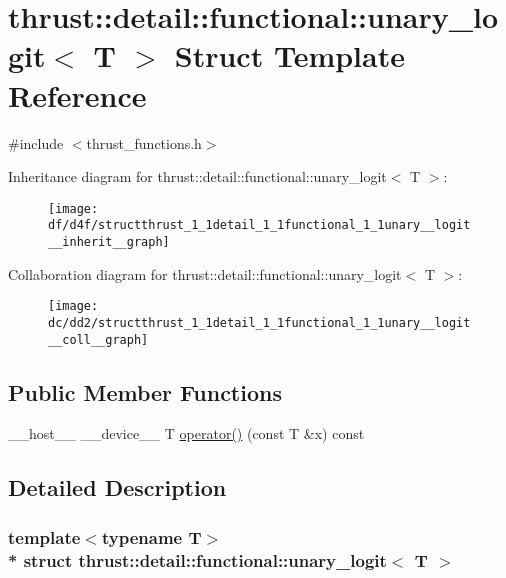 \hypertarget{structthrust_1_1detail_1_1functional_1_1unary__logit}{}\section{thrust\+:\+:detail\+:\+:functional\+:\+:unary\+\_\+logit$<$ T $>$ Struct Template Reference}
\label{structthrust_1_1detail_1_1functional_1_1unary__logit}


{\ttfamily \#include $<$thrust\+\_\+functions.\+h$>$}



Inheritance diagram for thrust\+:\+:detail\+:\+:functional\+:\+:unary\+\_\+logit$<$ T $>$\+:
\nopagebreak
\begin{figure}[H]
\begin{center}
\leavevmode
\texttt{[image: df/d4f/structthrust\_1\_1detail\_1\_1functional\_1\_1unary\_\_logit\_\_inherit\_\_graph]}
\end{center}
\end{figure}


Collaboration diagram for thrust\+:\+:detail\+:\+:functional\+:\+:unary\+\_\+logit$<$ T $>$\+:
\nopagebreak
\begin{figure}[H]
\begin{center}
\leavevmode
\texttt{[image: dc/dd2/structthrust\_1\_1detail\_1\_1functional\_1\_1unary\_\_logit\_\_coll\_\_graph]}
\end{center}
\end{figure}
\subsection*{Public Member Functions}
\begin{DoxyCompactItemize}
\item 
\+\_\+\+\_\+host\+\_\+\+\_\+ \+\_\+\+\_\+device\+\_\+\+\_\+ T \hyperlink{structthrust_1_1detail_1_1functional_1_1unary__logit_a8de2bf134020649c943862533931057c}{operator()} (const T \&x) const 
\end{DoxyCompactItemize}


\subsection{Detailed Description}
\subsubsection*{template$<$typename T$>$\\*
struct thrust\+::detail\+::functional\+::unary\+\_\+logit$<$ T $>$}



